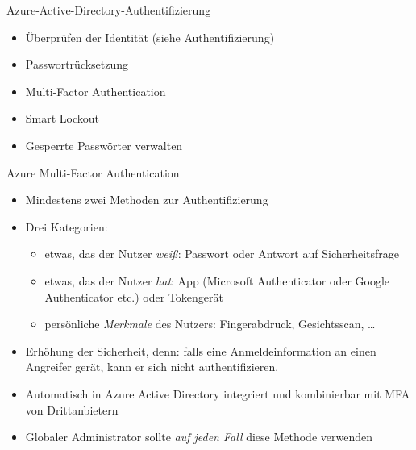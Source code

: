 \begin{flashcard}[\ ]{Azure-Active-Directory-Authentifizierung}
    \begin{itemize}
        \item Überprüfen der Identität
\newline(siehe Authentifizierung)
        \item Passwortrücksetzung
        \item Multi-Factor Authentication
        \item Smart Lockout
        \item Gesperrte Passwörter verwalten
    \end{itemize}
\end{flashcard}

\begin{flashcard}[Definition]{Azure Multi-Factor Authentication}
    \begin{itemize}
        \item Mindestens zwei Methoden zur Authentifizierung
        \item Drei Kategorien:
            \begin{itemize}
                \item etwas, das der Nutzer \emph{weiß}: Passwort oder Antwort auf Sicherheitsfrage
                \item etwas, das der Nutzer \emph{hat}: App (Microsoft Authenticator oder Google Authenticator etc.) oder Tokengerät
                \item persönliche \emph{Merkmale} des Nutzers: Fingerabdruck, Gesichtsscan, \ldots
        \end{itemize}
        \item Erhöhung der Sicherheit, denn: falls eine Anmeldeinformation an einen Angreifer gerät, kann er sich nicht authentifizieren.
        \item Automatisch in Azure Active Directory integriert und kombinierbar mit MFA von Drittanbietern
        \item Globaler Administrator sollte \emph{auf jeden Fall} diese Methode verwenden
    \end{itemize}
\end{flashcard}

